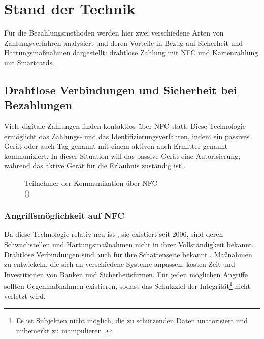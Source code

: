 \section{Stand der Technik}

Für die Bezahlungsmethoden werden hier zwei verschiedene Arten von Zahlungsverfahren analysiert und deren
Vorteile in Bezug auf Sicherheit und Härtungsmaßnahmen dargestellt: drahtlose Zahlung mit NFC und 
Kartenzahlung mit Smartcards.

\subsection{Drahtlose Verbindungen und Sicherheit bei Bezahlungen}

Viele digitale Zahlungen finden kontaktlos über NFC statt. Diese Technologie ermöglicht das Zahlungs- und
das Identifizierungsverfahren, indem ein passives Gerät oder auch Tag genannt mit einem aktiven 
auch Ermitter genannt kommuniziert. In dieser Situation will das passive Gerät eine Autorisierung,
während das aktive Gerät für die Erlaubnis zuständig ist \cite{refart:NFNK}. 

\begin{figure}[H]
   \caption{Teilnehmer der Kommunikation über NFC\\(\cite{refart:GPIN})}
   \label{fig:refart_GPIN}
\end{figure}


\subsubsection{Angriffsmöglichkeit auf NFC}

Da diese Technologie relativ neu ist \cite{refip:NTAS}, sie existiert seit 2006, sind deren Schwachstellen 
und Härtungsmaßnahmen nicht in ihrer Vollständigkeit bekannt. Drahtlose Verbindungen sind auch für ihre Schattenseite 
bekannt \cite{refip:NYRS}. Maßnahmen zu entwickeln, die sich an verschiedene Systeme anpassen, kosten Zeit 
und Investitionen von Banken und Sicherheitsfirmen. Für jeden möglichen Angriffe sollten Gegenmaßnahmen existieren, 
sodass das Schutzziel der Integrität\footnote{Es ist Subjekten nicht möglich, die zu schützenden Daten unatorisiert und 
unbemerkt zu manipulieren \cite{refbook:SWIS}.} nicht verletzt wird.


